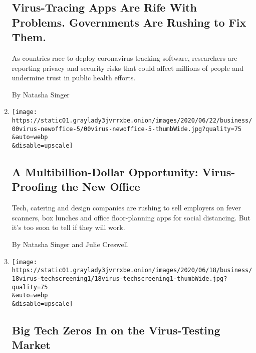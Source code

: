 \begin{enumerate}
  \hypertarget{virus-tracing-apps-are-rife-with-problems-governments-are-rushing-to-fix-them}{%
  \subsection{Virus-Tracing Apps Are Rife With Problems. Governments Are
  Rushing to Fix
  Them.}\label{virus-tracing-apps-are-rife-with-problems-governments-are-rushing-to-fix-them}}

  As countries race to deploy coronavirus-tracking software, researchers
  are reporting privacy and security risks that could affect millions of
  people and undermine trust in public health efforts.

  By Natasha Singer
\item
  \href{/2020/06/22/business/virus-office-workplace-return.html}{}

  \texttt{[image: https://static01.graylady3jvrrxbe.onion/images/2020/06/22/business/00virus-newoffice-5/00virus-newoffice-5-thumbWide.jpg?quality=75\\\&auto=webp\\\&disable=upscale]}

  \hypertarget{a-multibillion-dollar-opportunity-virus-proofing-the-new-office}{%
  \subsection{A Multibillion-Dollar Opportunity: Virus-Proofing the New
  Office}\label{a-multibillion-dollar-opportunity-virus-proofing-the-new-office}}

  Tech, catering and design companies are rushing to sell employers on
  fever scanners, box lunches and office floor-planning apps for social
  distancing. But it's too soon to tell if they will work.

  By Natasha Singer and Julie Creswell
\item
  \href{/2020/06/18/technology/big-tech-google-verily-virus-testing.html}{}

  \texttt{[image: https://static01.graylady3jvrrxbe.onion/images/2020/06/18/business/18virus-techscreening1/18virus-techscreening1-thumbWide.jpg?quality=75\\\&auto=webp\\\&disable=upscale]}

  \hypertarget{big-tech-zeros-in-on-the-virus-testing-market}{%
  \subsection{Big Tech Zeros In on the Virus-Testing
  Market}\label{big-tech-zeros-in-on-the-virus-testing-market}}


\end{enumerate}
